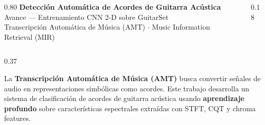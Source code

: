\documentclass[final]{beamer}
\begin{document}
\begin{frame}[t]{}

\begin{tcolorbox}[
  enhanced, colback=darkblue, colframe=darkblue,
  arc=0pt, boxrule=0pt,
  left=20pt, right=20pt, top=14pt, bottom=14pt
]
  \begin{columns}[c]
    \begin{column}{0.80\linewidth}
      {\color{white}\fontsize{32}{38}\selectfont\bfseries
        Detecci\'on Autom\'atica de Acordes de Guitarra Ac\'ustica}\\[6pt]
      {\color{accentgold}\fontsize{17}{22}\selectfont
        Avance --- Entrenamiento CNN 2-D sobre GuitarSet}\\[4pt]
      {\color{white!80!darkblue}\fontsize{12}{16}\selectfont
        Transcripci\'on Autom\'atica de M\'usica (AMT) $\cdot$
        Music Information Retrieval (MIR)}
    \end{column}
    \begin{column}{0.18\linewidth}
      \centering
    \end{column}
  \end{columns}
\end{tcolorbox}

\vspace{6pt}

\begin{columns}[t,totalwidth=\linewidth]

\begin{column}{0.37\linewidth}

\begin{tcolorbox}[sectionbox, title={$\blacktriangleright$ Resumen del Proyecto}]
La \textbf{Transcripci\'on Autom\'atica de M\'usica (AMT)} busca convertir se\~nales de audio
en representaciones simb\'olicas como acordes. Este trabajo desarrolla un sistema de
clasificaci\'on de acordes de guitarra ac\'ustica usando \textbf{aprendizaje profundo}
sobre caracter\'isticas espectrales extra\'idas con STFT, CQT y chroma features.


\end{tcolorbox}
\end{column}
\end{columns}
\end{frame}
\end{document}
